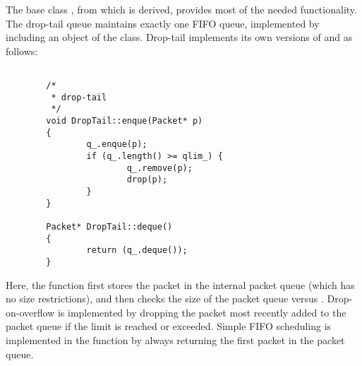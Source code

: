 The base class ,
from which  is derived, provides most
of the needed functionality.
The drop-tail queue maintains exactly one FIFO queue, implemented
by including an object of the  class.
Drop-tail implements its own versions of  and 
as follows:
\begin{small}
\begin{verbatim}

        /*
         * drop-tail
         */
        void DropTail::enque(Packet* p)
        {
                q_.enque(p);
                if (q_.length() >= qlim_) {
                        q_.remove(p);
                        drop(p);
                }
        }

        Packet* DropTail::deque()
        {
                return (q_.deque());
        }
\end{verbatim}
\end{small}
Here, the  function first stores the packet in the
internal packet queue (which has no size restrictions), and then
checks the size of the packet queue versus .
Drop-on-overflow is implemented by dropping the packet most recently
added to the packet queue if the limit is reached or exceeded.
Simple FIFO scheduling is implemented in the  function
by always returning the first packet in the packet queue.
